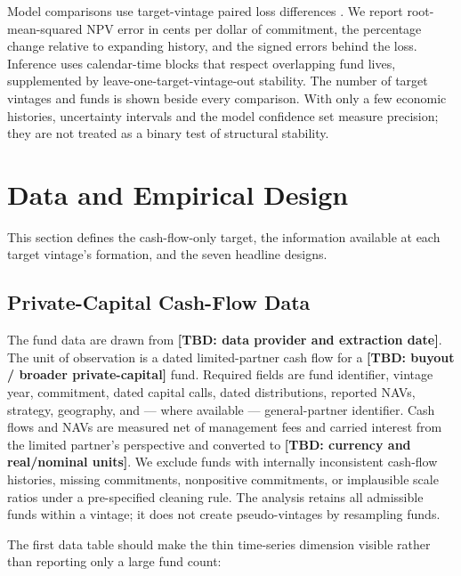 \documentclass[11pt]{article}
\newcommand{\tbd}[1]{\textbf{[TBD: #1]}}
\begin{document}
Model comparisons use target-vintage paired loss differences
\citep{GiacominiWhite2006}. We report root-mean-squared NPV error in cents per
dollar of commitment, the percentage change relative to expanding history,
and the signed errors behind the loss. Inference uses calendar-time blocks that
respect overlapping fund lives, supplemented by leave-one-target-vintage-out
stability. The number of target vintages and funds is shown beside every
comparison. With only a few economic histories, uncertainty intervals and the
model confidence set measure precision; they are not treated as a binary test
of structural stability.

\section{Data and Empirical Design}

This section defines the cash-flow-only target, the information available at
each target vintage's formation, and the seven headline designs.

\subsection{Private-Capital Cash-Flow Data}

The fund data are drawn from \tbd{data provider and extraction date}. The unit
of observation is a dated limited-partner cash flow for a \tbd{buyout / broader
private-capital} fund. Required fields are fund identifier, vintage year,
commitment, dated capital calls, dated distributions, reported NAVs, strategy,
geography, and --- where available --- general-partner identifier. Cash flows
and NAVs are measured net of management fees and carried interest from the
limited partner's perspective and converted to \tbd{currency and real/nominal
units}. We exclude funds with internally inconsistent cash-flow histories,
missing commitments, nonpositive commitments, or implausible scale ratios
under a pre-specified cleaning rule. The analysis retains all admissible funds
within a vintage; it does not create pseudo-vintages by resampling funds.

The first data table should make the thin time-series dimension visible rather
than reporting only a large fund count:
\end{document}
